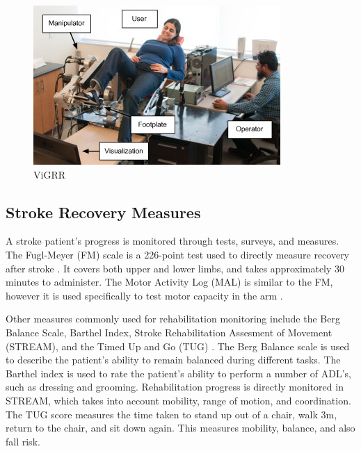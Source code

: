 \documentclass[12pt]{report}
\begin{document}
	
	\begin{figure}[t] 
		\centering
		\includegraphics[width=0.75\linewidth]{Vigrr}
		\caption{ViGRR}
		\label{fig:vigrr}
	\end{figure}	
	
	

	\subsection{Stroke Recovery Measures}
	
	A stroke patient's progress is monitored through tests, surveys, and measures. The Fugl-Meyer (FM) scale is a 226-point test used to directly measure recovery after stroke \cite{Gladstone2002}. It covers both upper and lower limbs, and takes approximately 30 minutes to administer. The Motor Activity Log (MAL) is similar to the FM, however it is used specifically to test motor capacity in the arm \cite{Uswatte2006}.

Other measures commonly used for rehabilitation monitoring include the Berg Balance Scale, Barthel Index, Stroke Rehabilitation Assesment of Movement (STREAM), and the Timed Up and Go (TUG) \cite{Salbach2001}. The Berg Balance scale is used to describe the patient's ability to remain balanced during different tasks. The Barthel index is used to rate the patient's ability to perform a number of ADL's, such as dressing and grooming. Rehabilitation progress is directly monitored in STREAM, which takes into account mobility, range of motion, and coordination. The TUG score measures the time taken to stand up out of a chair, walk 3m, return to the chair, and sit down again. This measures mobility, balance, and also fall risk. 
\end{document}
